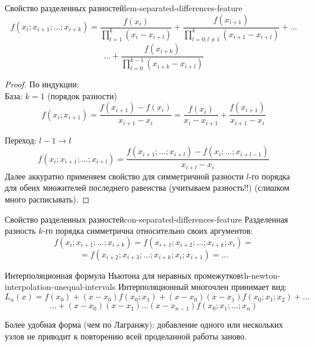 \documentclass[14pt]{extarticle}
\begin{document}
    \begin{lemma}{Свойство разделенных разностей}{lem-separated-differences-feature}
        $$f(x_{i}; x_{i + 1}; \ldots; x_{i + k}) = \frac{f(x_{i})}{\prod_{l = 1}^{k} (x_{i} - x_{i + l})} + \frac{f(x_{i + 1})}{\prod_{l = 0; l \neq 1}^{k} (x_{i + 1} - x_{i + l})} + \ldots$$ $$\ldots + \frac{f(x_{i + k})}{\prod_{l = 0}^{k - 1} (x_{i + k} - x_{i + l})}$$
    
        \begin{proof}
            По индукции:\\
            База: $k = 1$ (порядок разности)\\
            $$f(x_{i}; x_{i + 1}) = \frac{f(x_{i + 1}) - f(x_{i})}{x_{i + 1} - x_{i}} = \frac{f(x_{i})}{x_{i} - x_{i+1}} + \frac{f(x_{i + 1})}{x_{i + 1} - x_{i}}$$
            
            Переход: $l-1 \to l$\\
            $$f(x_{i}; x_{i + 1}; \ldots; x_{i + l}) = \frac{f(x_{i + 1}; \ldots; x_{i + l}) - f(x_{i}; \ldots; x_{i+l-1})}{x_{i + l} - x_{i}}$$
            Далее аккуратно применяем свойство для симметричной разности $l$-го порядка для обеих множителей последнего равенства (учитываем разность!!) (слишком много расписывать).
        \end{proof}
    \end{lemma}

    \begin{consequence}{Свойство разделенных разностей}{con-separated-differences-feature}
        Разделенная разность $k$-го порядка симметрична относительно своих аргументов:
        $$f(x_{i}; x_{i + 1}; \ldots; x_{i + k}) = f(x_{i + 1}; x_{i + 2}; \ldots; x_{i + k}; x_{i}) = $$ $$ = f(x_{i + 2}; x_{i + 3}; \ldots; x_{i + k}; x_{i}; x_{i + 1}) = \ldots$$ 
    \end{consequence}

    \begin{theorem}{Интерполяционная формула Ньютона для неравных промежутков}{th-newton-interpolation-unequal-intervals}
        Интерполяционный многочлен принимает вид:
        $$L_{n}(x) = f(x_{0}) + (x - x_{0})f(x_{0}; x_{1}) + (x - x_{0})(x - x_{1})f(x_{0};x_{1};x_{2}) + \ldots$$ 
        $$\ldots + (x - x_{0})(x - x_{1})\ldots(x - x_{n-1})f(x_{0}; x_{1}; \ldots; x_{n})$$
    
        Более удобная форма (чем по Лагранжу): добавление одного или нескольких узлов не приводит к повторению всей проделанной работы заново.
    \end{theorem}
\end{document}
